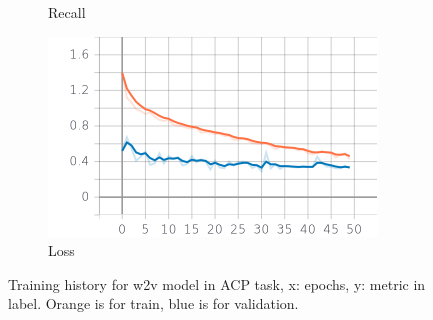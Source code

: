 \documentclass{article}
\begin{document}
\begin{figure}
\begin{subfigure}{.33\textwidth}
 		            \caption{Recall}
 		            \label{w2v_acp_epoch_recall}
		        \end{subfigure}
                \begin{subfigure}{.33\textwidth}
 		            \centering
 		            \includegraphics[width=\textwidth]{imgs/plots/w2v_acp_epoch_loss.png}
 		            \caption{Loss}
 		            \label{w2v_acp_epoch_loss}
		        \end{subfigure}
		    \caption{Training history for w2v model in ACP task, x: epochs, y: metric in label.
                    \color{orange} Orange is for train, \color{blue} blue is for validation.\color{black}}
		    \label{w2v_acp_history}
	        \end{figure}
\end{document}

